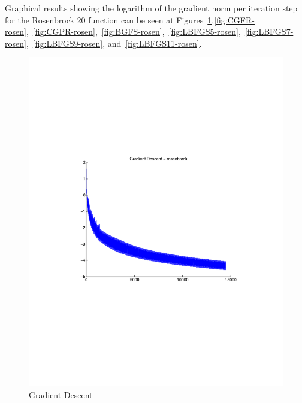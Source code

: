 \documentclass[12pt]{amsart}
\begin{document}
Graphical results showing the logarithm of the gradient norm per iteration step for the Rosenbrock 20 function can be seen at Figures~\ref{fig:GD-rosen},\ref{fig:CGFR-rosen},~\ref{fig:CGPR-rosen},~\ref{fig:BGFS-rosen},~\ref{fig:LBFGS5-rosen},~\ref{fig:LBFGS7-rosen},~\ref{fig:LBFGS9-rosen}, and~\ref{fig:LBFGS11-rosen}.
\begin{figure}[thpb]
\centering
\includegraphics[scale=0.60,clip=true,viewport=1in 3in 8in 8in]{images/rosenbrock-20/GD.pdf}
\caption{Gradient Descent}
\label{fig:GD-rosen}
\end{figure}
\end{document}
